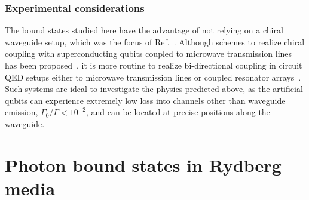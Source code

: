 \documentclass[pra,twocolumn,showpacs,preprintnumbers,amsmath,amssymb]{revtex4-1}
\begin{document}

\subsubsection{Experimental considerations}\label{experimentTLA}

The bound states studied here have the advantage of not relying on a chiral waveguide setup, which was the focus of Ref.~\cite{mahmo_calajo}.
Although schemes to realize chiral coupling with superconducting qubits coupled to microwave transmission lines has been proposed~\cite{Guimond,Gheeraert}, it is more routine to realize bi-directional coupling in circuit QED setups either to microwave transmission lines or coupled resonator arrays~\cite{Sundaresan,painter1,painter2,ustinov,ustinov_topo,marcoBS}. Such systems are ideal to investigate the physics predicted above, as the artificial qubits can experience extremely low loss into channels other than waveguide emission, $\Gamma_0/\Gamma<10^{-2}$, and can be located at precise positions along the waveguide.


\section{Photon bound states in Rydberg media}\label{Sec.Rydmedia}
\end{document}
